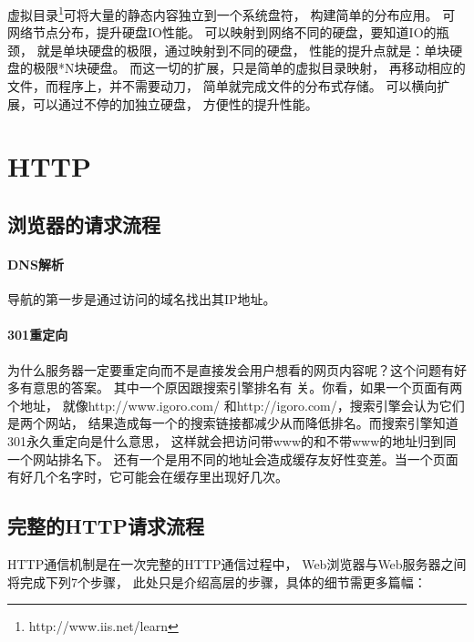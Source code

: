\documentclass{book}
\begin{document}
虚拟目录\footnote{http://www.iis.net/learn}可将大量的静态内容独立到一个系统盘符，
构建简单的分布应用。
可网络节点分布，提升硬盘IO性能。
可以映射到网络不同的硬盘，要知道IO的瓶颈，
就是单块硬盘的极限，通过映射到不同的硬盘，
性能的提升点就是：单块硬盘的极限*N块硬盘。
而这一切的扩展，只是简单的虚拟目录映射，
再移动相应的文件，而程序上，并不需要动刀，
简单就完成文件的分布式存储。
可以横向扩展，可以通过不停的加独立硬盘，
方便性的提升性能。

\section{HTTP}

\subsection{浏览器的请求流程}

\paragraph{DNS解析}导航的第一步是通过访问的域名找出其IP地址。

\paragraph{301重定向}为什么服务器一定要重定向而不是直接发会用户想看的网页内容呢？这个问题有好多有意思的答案。
其中一个原因跟搜索引擎排名有 关。你看，如果一个页面有两个地址，
就像http://www.igoro.com/ 和http://igoro.com/，搜索引擎会认为它们是两个网站，
结果造成每一个的搜索链接都减少从而降低排名。而搜索引擎知道301永久重定向是什么意思，
这样就会把访问带www的和不带www的地址归到同一个网站排名下。
还有一个是用不同的地址会造成缓存友好性变差。当一个页面有好几个名字时，它可能会在缓存里出现好几次。

\subsection{完整的HTTP请求流程}

HTTP通信机制是在一次完整的HTTP通信过程中，
Web浏览器与Web服务器之间将完成下列7个步骤，
此处只是介绍高层的步骤，具体的细节需更多篇幅：
\end{document}
